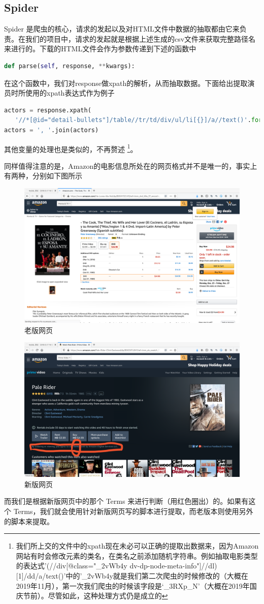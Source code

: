 \documentclass{ctexrep}
\begin{document}
	\subsection{Spider}
	Spider 是爬虫的核心，请求的发起以及对HTML文件中数据的抽取都由它来负责。在我们的项目中，请求的发起就是根据上述生成的csv文件来获取完整路径名来进行的。下载的HTML文件会作为参数传递到下述的函数中\begin{lstlisting}[language=python]
 def parse(self, response, **kwargs):
	\end{lstlisting}
	在这个函数中，我们对response做xpath的解析，从而抽取数据。下面给出提取演员时所使用的xpath表达式作为例子\begin{lstlisting}[language=python]
actors = response.xpath(
   '//*[@id="detail-bullets"]/table//tr/td/div/ul/li[{}]/a//text()'.format(i)).extract()
actors = ', '.join(actors)
	\end{lstlisting}
	其他变量的处理也是类似的，不再赘述 \footnote{我们所上交的文件中的xpath现在未必可以正确的提取出数据来，因为Amazon网站有时会修改元素的类名，在类名之前添加随机字符串。例如抽取电影类型的表达式'(//div[@class="\_2vWb4y dv-dp-node-meta-info"]//dl)[1]/dd/a/text()'中的'\_2vWb4y就是我们第二次爬虫的时候修改的（大概在2019年11月），第一次我们爬虫的时候该字段是‘\_3RXp\_N’（大概在2019年国庆节前）。尽管如此，这种处理方式仍是成立的}。
	
	同样值得注意的是，Amazon的电影信息所处在的网页格式并不是唯一的，事实上有两种，分别如下图所示
	\begin{figure}[H]
		\centering
		\includegraphics[width=0.7\linewidth]{img/old}
		\caption{老版网页}
		\label{fig:old}
	\end{figure}
	\begin{figure}[H]
		\centering
		\includegraphics[width=0.7\linewidth]{img/new}
		\caption{新版网页}
		\label{fig:new}
	\end{figure}
	而我们是根据新版网页中的那个 Terms 来进行判断（用红色圈出）的。如果有这个 Terms，我们就会使用针对新版网页写的脚本进行提取，而老版本则使用另外的脚本来提取。
	
\end{document}
